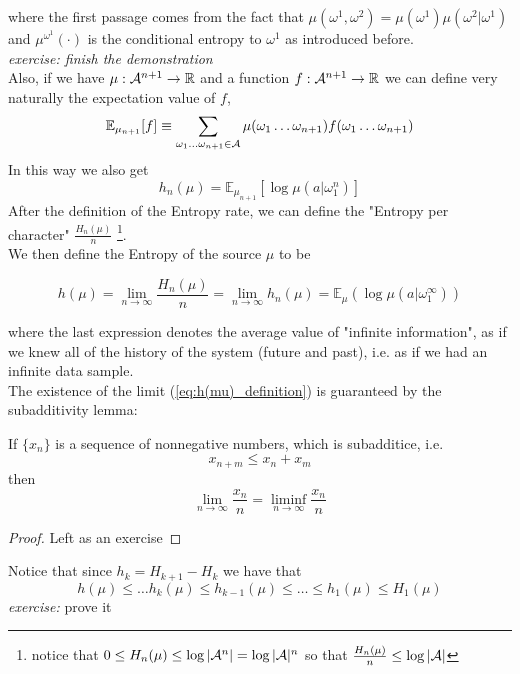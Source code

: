 where the first passage comes from the fact that $\mu(\omega^1, \omega^2) = \mu(\omega^1) \mu(\omega^2 | \omega^1)$ and $\mu^{\omega^1} (\cdot)$ is the conditional entropy to $\omega^1$ as introduced before.\\
\textit{exercise: finish the demonstration}
\\Also, if we have $\mu: \mathcal{A}^{n+1} \rightarrow \mathbb{R}$ and a function $f: \mathcal{A}^{n+1} \rightarrow \mathbb{R}$ we can define very naturally the expectation value of $f$,
\begin{equation*}
    \mathbb{E}_{\mu_{n+1}} [f] \equiv \sum_{\omega_1 \dots \omega_{n+1} \in \mathcal{A}} \mu(\omega_1 \dots \omega_{n+1}) f(\omega_1 \dots \omega_{n+1})
\end{equation*}
In this way we also get 
\begin{equation*}
    h_n(\mu) = \mathbb{E}_{\mu_{n+1}} [ \log \mu(a|\omega_1^n)]
\end{equation*}
After the definition of the Entropy rate, we can define the "Entropy per character" $\frac{H_n(\mu)}{n}$ \footnote{notice that $0 \leq H_n(\mu) \leq \log |\mathcal{A}^n| = \log|\mathcal{A}|^n$ so that $\frac{H_n(\mu)}{n} \leq \log |\mathcal{A}|$}.
\\We then define the Entropy of the source $\mu$ to be 
\begin{definition}
    \begin{equation}
    \label{eq:h(mu)_definition}
        h(\mu) = \lim_{n \rightarrow \infty} \frac{H_n(\mu)}{n} =  \lim_{n \rightarrow \infty} h_n(\mu) = \mathbb{E}_{\mu} (\log \mu(a | \omega_1^{\infty}))
    \end{equation}
\end{definition}
where the last expression denotes the average value of "infinite information", as if we knew all of the history of the system (future and past), i.e. as if we had an infinite data sample. 
\\The existence of the limit (\ref{eq:h(mu)_definition}) is guaranteed by the subadditivity lemma: 
\begin{lemma}
\hfill
    If $\{ x_n \}$ is a sequence of nonnegative numbers, which is subadditice, i.e. 
    \begin{equation*}
        x_{n+m} \leq x_n + x_m
    \end{equation*}
    then 
    \begin{equation*}
        \lim_{n \rightarrow \infty} \frac{x_n}{n} = \liminf_{n \rightarrow \infty}\frac{x_n}{n}
    \end{equation*}
\end{lemma}
\begin{proof}
    Left as an exercise
\end{proof}
Notice that since $h_k = H_{k+1} - H_k$ we have that
\begin{equation*}
    h(\mu) \leq \dots h_k(\mu) \leq h_{k-1}(\mu) \leq \dots \leq h_1(\mu) \leq H_1(\mu)
\end{equation*}
\textit{exercise:} prove it

